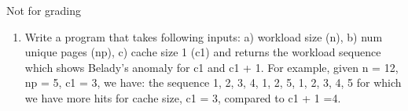 \documentclass[]{article}
\begin{document}
Not for grading
\begin{enumerate}
\item Write a program that takes following inputs: a) workload size (n), b) num unique pages (np), c) cache size 1 (c1) and returns the workload sequence which shows Belady's anomaly for c1 and c1 + 1. For example, given n = 12, np = 5, c1 = 3, we have: the sequence 1, 2, 3, 4, 1, 2, 5, 1, 2, 3, 4, 5 for which we have more hits for cache size, c1 = 3, compared to c1 + 1 =4.
\end{enumerate}
\end{document}
